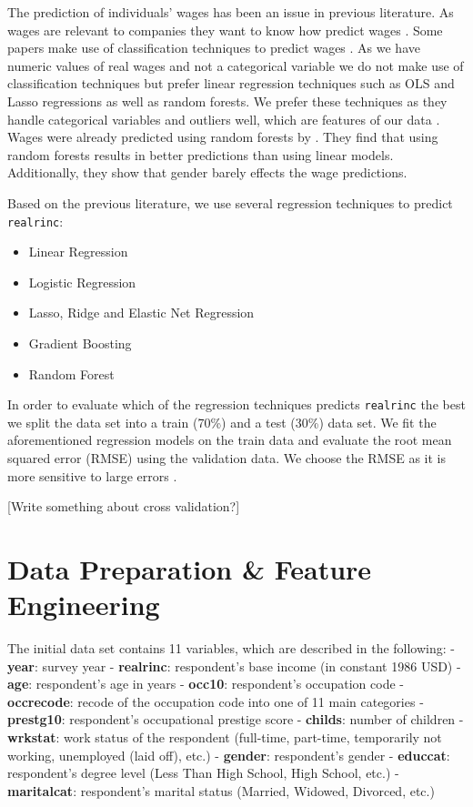 \documentclass[11pt,a4paper]{article}
\begin{document}
The prediction of individuals' wages has been an issue in previous
literature. As wages are relevant to companies they want to know how
predict wages \autocite{Chakraborti}. Some papers make use of
classification techniques to predict wages \autocite{Chakraborti}. As we
have numeric values of real wages and not a categorical variable we do
not make use of classification techniques but prefer linear regression
techniques such as OLS and Lasso regressions as well as random forests.
We prefer these techniques as they handle categorical variables and
outliers well, which are features of our data \autocite{Cutler}. Wages
were already predicted using random forests by \autocite{Eichinger}.
They find that using random forests results in better predictions than
using linear models. Additionally, they show that gender barely effects
the wage predictions.

Based on the previous literature, we use several regression techniques
to predict \texttt{realrinc}:

\begin{itemize}
\item
  Linear Regression
\item
  Logistic Regression
\item
  Lasso, Ridge and Elastic Net Regression
\item
  Gradient Boosting
\item
  Random Forest
\end{itemize}

In order to evaluate which of the regression techniques predicts
\texttt{realrinc} the best we split the data set into a train (70\%) and
a test (30\%) data set. We fit the aforementioned regression models on
the train data and evaluate the root mean squared error (RMSE) using the
validation data. We choose the RMSE as it is more sensitive to large
errors \autocite{Arour}.

{[}Write something about cross validation?{]}

\hypertarget{data-preparation-feature-engineering}{%
\section{Data Preparation \& Feature
Engineering}\label{data-preparation-feature-engineering}}

The initial data set contains 11 variables, which are described in the
following: - \textbf{year}: survey year - \textbf{realrinc}:
respondent's base income (in constant 1986 USD) - \textbf{age}:
respondent's age in years - \textbf{occ10}: respondent's occupation code
- \textbf{occrecode}: recode of the occupation code into one of 11 main
categories - \textbf{prestg10}: respondent's occupational prestige score
- \textbf{childs}: number of children - \textbf{wrkstat}: work status of
the respondent (full-time, part-time, temporarily not working,
unemployed (laid off), etc.) - \textbf{gender}: respondent's gender -
\textbf{educcat}: respondent's degree level (Less Than High School, High
School, etc.) - \textbf{maritalcat}: respondent's marital status
(Married, Widowed, Divorced, etc.)
\end{document}
